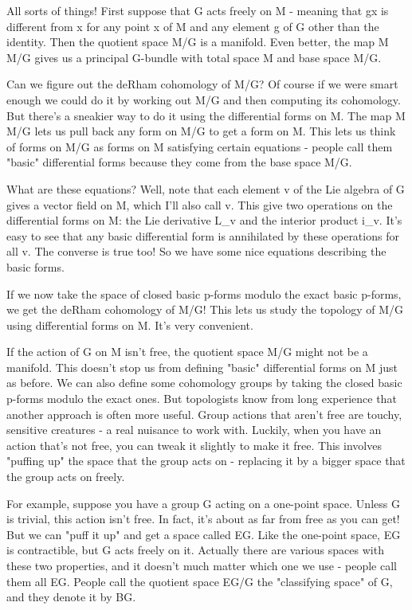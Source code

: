 All sorts of things!  First suppose that G acts freely on M - meaning
that gx is different from x for any point x of M and any element g of G
other than the identity.  Then the quotient space M/G is a manifold.  
Even better, the map M \to  M/G gives us a principal G-bundle with total
space M and base space M/G.

Can we figure out the deRham cohomology of M/G?  Of course if we were
smart enough we could do it by working out M/G and then computing its
cohomology.  But there's a sneakier way to do it using the differential
forms on M.  The map M \to  M/G lets us pull back any form on M/G to
get a form on M.  This lets us think of forms on M/G as forms on M
satisfying certain equations - people call them "basic"
differential forms because they come from the base space M/G.

What are these equations?  Well, note that each element v of the Lie
algebra of G gives a vector field on M, which I'll also call v.  This
give two operations on the differential forms on M: the Lie derivative 
L_{v}
and the interior product i_{v}.  
It's easy to see that any basic differential
form is annihilated by these operations for all v.  The converse is true
too!  So we have some nice equations describing the basic forms.  

If we now take the space of closed basic p-forms modulo the exact basic
p-forms, we get the deRham cohomology of M/G!  This lets us study the
topology of M/G using differential forms on M.  It's very convenient.

If the action of G on M isn't free, the quotient space M/G might not be
a manifold.  This doesn't stop us from defining "basic" differential
forms on M just as before.  We can also define some cohomology groups by
taking the closed basic p-forms modulo the exact ones.  But topologists
know from long experience that another approach is often more useful. 
Group actions that aren't free are touchy, sensitive creatures - a real
nuisance to work with.  Luckily, when you have an action that's not
free, you can tweak it slightly to make it free.  This involves "puffing
up" the space that the group acts on - replacing it by a bigger space
that the group acts on freely.

For example, suppose you have a group G acting on a one-point space. 
Unless G is trivial, this action isn't free.  In fact, it's about as far
from free as you can get!  But we can "puff it up" and get a space
called EG.  Like the one-point space, EG is contractible, but G acts
freely on it.  Actually there are various spaces with these two
properties, and it doesn't much matter which one we use - people call
them all EG.  People call the quotient space EG/G the "classifying
space" of G, and they denote it by BG.  

